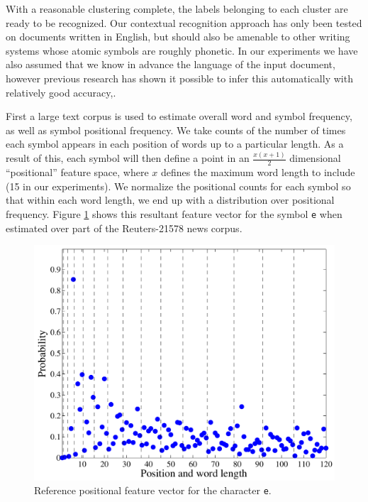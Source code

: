 \documentclass[times, 10pt,twocolumn]{article}
\begin{document}

With a reasonable clustering complete, the labels belonging to each cluster are
ready to be recognized.  Our contextual recognition approach has only been
tested on documents written in English, but should also be amenable to other
writing systems whose atomic symbols are roughly phonetic.  In our experiments
we have also assumed that we know in advance the language of the
input document, however previous research has shown it possible to infer this
automatically with relatively good accuracy\cite{sibun1994},\cite{hochberg1997}.

First a large text corpus is used to estimate overall word and symbol frequency,
as well as symbol positional frequency.  We take counts of the number of times
each symbol appears in each position of words up to a particular length.  As
a result of this, each symbol will then define a point in an $\frac{x
(x+1)}{2}$ dimensional ``positional'' feature space, where $x$ defines the
maximum word length to include (15 in our experiments).  We normalize the
positional counts for each symbol so that within each word length, we end up
with a distribution over positional frequency.  Figure \ref{e_pos_fig} shows
this resultant feature vector for the symbol {\tt e} when estimated over part of
the Reuters-21578 news corpus\cite{lewis2004}.

\begin{figure}[ht]
  \centering
  \includegraphics[scale=.4]{figures/e_pos_feature}
  \caption{Reference positional feature vector for the character {\tt e}.}
  \label{e_pos_fig}
\end{figure}
\end{document}
